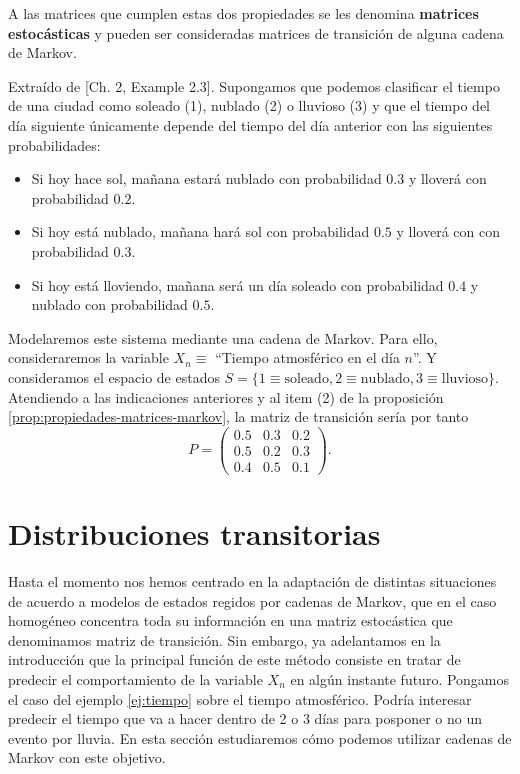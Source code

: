 A las matrices que cumplen estas dos propiedades se les denomina \textbf{matrices estocásticas} y pueden ser consideradas matrices de transición de alguna cadena de Markov.

\begin{ejemplo}
    \label{ej:tiempo}
    Extraído de \cite{kulkarni-2012}[Ch. 2, Example 2.3]. Supongamos que podemos clasificar el tiempo de una ciudad como soleado (1), nublado (2) o lluvioso (3) y que el tiempo del día siguiente únicamente depende del tiempo del día anterior con las siguientes probabilidades:
    \begin{itemize}
        \item Si hoy hace sol, mañana estará nublado con probabilidad $0.3$ y lloverá con probabilidad $0.2$.
        \item Si hoy está nublado, mañana hará sol con probabilidad $0.5$ y lloverá con con probabilidad $0.3$.
        \item Si hoy está lloviendo, mañana será un día soleado con probabilidad $0.4$ y nublado con probabilidad $0.5$.
    \end{itemize}

    Modelaremos este sistema mediante una cadena de Markov. Para ello, consideraremos la variable $X_n \equiv$ ``Tiempo atmosférico en el día $n$''. Y consideramos el espacio de estados $S = \{ 1\equiv\text{soleado}, 2\equiv\text{nublado}, 3\equiv\text{lluvioso}\}$. Atendiendo a las indicaciones anteriores y al item (2) de la proposición \ref{prop:propiedades-matrices-markov}, la matriz de transición sería por tanto
    $$ P = \begin{pmatrix}
        0.5 & 0.3 & 0.2 \\
        0.5 & 0.2 & 0.3 \\
        0.4 & 0.5 & 0.1
    \end{pmatrix}.
    $$

\end{ejemplo}

\section{Distribuciones transitorias}

Hasta el momento nos hemos centrado en la adaptación de distintas situaciones de acuerdo a modelos de estados regidos por cadenas de Markov, que en el caso homogéneo concentra toda su información en una matriz estocástica que denominamos matriz de transición. Sin embargo, ya adelantamos en la introducción que la principal función de este método consiste en tratar de predecir el comportamiento de la variable $X_n$ en algún instante futuro. Pongamos el caso del ejemplo \ref{ej:tiempo} sobre el tiempo atmosférico. Podría interesar predecir el tiempo que va a hacer dentro de 2 o 3 días para posponer o no un evento por lluvia. En esta sección estudiaremos cómo podemos utilizar cadenas de Markov con este objetivo.

